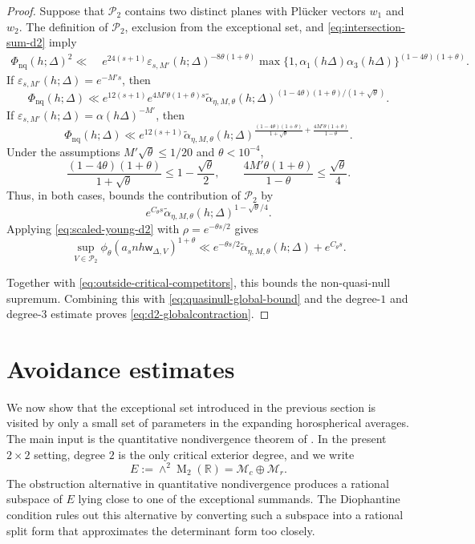 \documentclass[reqno,11pt]{amsart}
\theoremstyle{definition}
\theoremstyle{remark}
\numberwithin{equation}{section}
\newcommand{\M}{\operatorname{M}}
\begin{document}
\begin{proof}
Suppose that $\mathcal P_2$ contains two distinct planes with Pl\"ucker
vectors $w_1$ and $w_2$. The definition of $\mathcal P_2$, exclusion from
the exceptional set, and \eqref{eq:intersection-sum-d2} imply
$$
\begin{aligned}
\Phi_{\mathrm{nq}}(h;\Delta)^2
\ll\;&
e^{24(s+1)}
\varepsilon_{s,M'}(h;\Delta)^{-8\theta(1+\theta)}
\max\{1,\alpha_1(h\Delta)\alpha_3(h\Delta)\}
^{(1-4\theta)(1+\theta)}.
\end{aligned}
$$
If $\varepsilon_{s,M'}(h;\Delta)=e^{-M's}$, then
$$
\Phi_{\mathrm{nq}}(h;\Delta)
\ll
e^{12(s+1)}
e^{4M'\theta(1+\theta)s}
\widetilde\alpha_{\eta,M,\theta}(h;\Delta)^{
(1-4\theta)(1+\theta)/(1+\sqrt\theta)}.
$$
If $\varepsilon_{s,M'}(h;\Delta)=\alpha(h\Delta)^{-M'}$, then
$$
\Phi_{\mathrm{nq}}(h;\Delta)
\ll
e^{12(s+1)}
\widetilde\alpha_{\eta,M,\theta}(h;\Delta)^{
\frac{(1-4\theta)(1+\theta)}{1+\sqrt\theta}
+
\frac{4M'\theta(1+\theta)}{1-\theta}
}.
$$
Under the assumptions $M'\sqrt\theta\le1/20$ and $\theta<10^{-4}$,
$$
\frac{(1-4\theta)(1+\theta)}{1+\sqrt\theta}
\le
1-\frac{\sqrt\theta}{2},
\qquad
\frac{4M'\theta(1+\theta)}{1-\theta}
\le
\frac{\sqrt\theta}{4}.
$$
Thus, in both cases,  bounds the contribution
of $\mathcal P_2$ by
$$
e^{C_\theta s}
\widetilde\alpha_{\eta,M,\theta}(h;\Delta)^{1-\sqrt\theta/4}.
$$
Applying \eqref{eq:scaled-young-d2} with
$\rho=e^{-\theta s/2}$ gives
$$
\sup_{V\in\mathcal P_2}
\phi_\theta(a_snh\mathsf w_{\Delta,V})^{1+\theta}
\ll
e^{-\theta s/2}
\widetilde\alpha_{\eta,M,\theta}(h;\Delta)+e^{C_\theta s}.
$$

Together with \eqref{eq:outside-critical-competitors}, this bounds the
non-quasi-null supremum. Combining this with
\eqref{eq:quasinull-global-bound} and the degree-$1$ and degree-$3$
estimate proves \eqref{eq:d2-globalcontraction}.
\end{proof}
\section{Avoidance estimates}
\label{s:avoidance}

We now show that the exceptional set introduced in the previous section is
visited by only a small set of parameters in the expanding horospherical
averages. The main input is the quantitative nondivergence theorem of
\cite{kleinbock:2008}. In the present $2\times2$ setting, degree $2$ is the
only critical exterior degree, and we write
$$
E:=\wedge^2\M_2(\mathbb R)
=
\mathcal M_c\oplus\mathcal M_r.
$$
The obstruction alternative in quantitative nondivergence produces a
rational subspace of $E$ lying close to one of the exceptional summands.
The Diophantine condition rules out this alternative by converting such a
subspace into a rational split form that approximates the determinant form
too closely.
\end{document}
